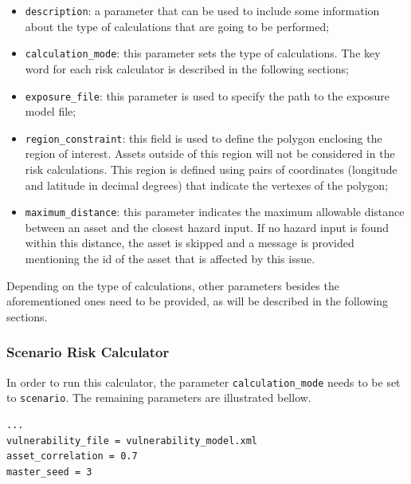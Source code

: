 \begin{itemize}
\item  \Verb+description+: a parameter that can be used to include some information about the type of calculations that are going to be performed;
\item  \Verb+calculation_mode+: this parameter sets the type of calculations. The key word for each risk calculator is described in the following sections;
\item  \Verb+exposure_file+: this parameter is used to specify the path to the \gls{exposure model} file;
\item  \Verb+region_constraint+: this field is used to define the polygon enclosing the region of interest. Assets outside of this region will not be considered in the risk calculations. This region is defined using pairs of coordinates (longitude and latitude in decimal degrees) that indicate the vertexes of the polygon;
\item  \Verb+maximum_distance+: this parameter indicates the maximum allowable distance between an \gls{asset} and the closest hazard input. If no hazard input is found within this distance, the \gls{asset} is skipped and a message is provided mentioning the id of the asset that is affected by this issue.
\end{itemize}

Depending on the type of calculations, other parameters besides the aforementioned ones need to be provided, as will be described in the following sections.

\subsubsection{Scenario Risk Calculator}
In order to run this calculator, the parameter \Verb+calculation_mode+ needs to be set to \Verb+scenario+. The remaining parameters are illustrated bellow.

\begin{Verbatim}[frame=single, commandchars=\\\{\}, samepage=true]
...
vulnerability_file = vulnerability_model.xml
asset_correlation = 0.7
master_seed = 3
\end{Verbatim}

